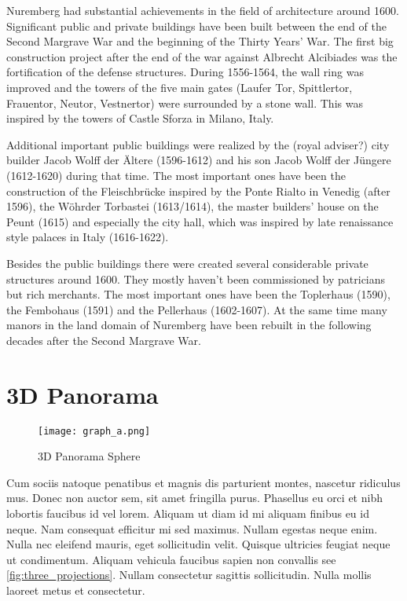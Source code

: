 Nuremberg had substantial achievements in the field of architecture around 1600. Significant public and private buildings have been built between the end of the Second Margrave War and the beginning of the Thirty Years' War.
The first big construction project after the end of the war against Albrecht Alcibiades was the fortification of the defense structures. During 1556-1564, the wall ring was improved and the towers of the five main gates (Laufer Tor, Spittlertor, Frauentor, Neutor, Vestnertor) were surrounded by a stone wall. This was inspired by the towers of Castle Sforza in Milano, Italy.

Additional important public buildings were realized by the (royal adviser?) city builder Jacob Wolff der Ältere (1596-1612) and his son Jacob Wolff der Jüngere (1612-1620) during that time. The most important ones have been the construction of the Fleischbrücke inspired by the Ponte Rialto in Venedig (after 1596), the Wöhrder Torbastei (1613/1614), the master builders' house on the Peunt (1615) and especially the city hall, which was inspired by late renaissance style palaces in Italy (1616-1622).

Besides the public buildings there were created several considerable private structures around 1600. They mostly haven't been commissioned by patricians but rich merchants. The most important ones have been the Toplerhaus (1590), the Fembohaus (1591) and the Pellerhaus (1602-1607).
At the same time many manors in the land domain of Nuremberg have been rebuilt in the following decades after the Second Margrave War.

\parencite[translated from German]{bookAcademiaNorica}




\section{3D Panorama}


\pagestyle{fancy}

\begin{figure}[h]
	\centering
	\texttt{[image: graph\_a.png]}
	\caption{3D Panorama Sphere}
	\label{fig:3d_panorama_sphere}
\end{figure}

Cum sociis natoque penatibus et magnis dis parturient montes, nascetur ridiculus mus. Donec non auctor sem, sit amet fringilla purus. Phasellus eu orci et nibh lobortis faucibus id vel lorem. Aliquam ut diam id mi aliquam finibus eu id neque. Nam consequat efficitur mi sed maximus. Nullam egestas neque enim. Nulla nec eleifend mauris, eget sollicitudin velit. Quisque ultricies feugiat neque ut condimentum. Aliquam vehicula faucibus sapien non convallis see \ref{fig:three_projections}. Nullam consectetur sagittis sollicitudin. Nulla mollis laoreet metus et consectetur.



